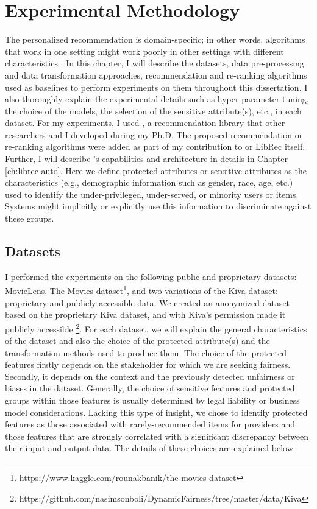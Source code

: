 \chapter{Experimental Methodology}
\label{ch:methodology}

The personalized recommendation is domain-specific; in other words, algorithms that work in one setting might work poorly in other settings with different characteristics \cite{Beel2016Reproducibility,bellogin2021improving}. In this chapter, I will describe the datasets, data pre-processing and data transformation approaches, recommendation and re-ranking algorithms used as baselines to perform experiments on them throughout this dissertation. I also thoroughly explain the experimental details such as hyper-parameter tuning, the choice of the models, the selection of the sensitive attribute(s), etc., in each dataset. For my experiments, I used \libauto{}, a recommendation library that other researchers and I developed during my Ph.D. The proposed recommendation or re-ranking algorithms were added as part of my contribution to \libauto{} or LibRec itself. Further, I will describe \libauto{}'s capabilities and architecture in details in Chapter \ref{ch:librec-auto}. Here we define protected attributes or sensitive attributes as the characteristics (e.g., demographic information such as gender, race, age, etc.) used to identify the under-privileged, under-served, or minority users or items. Systems might implicitly or explicitly use this information to discriminate against these groups.
    
\section{Datasets}

I performed the experiments on the following public and proprietary datasets: MovieLens\cite{movielens}, The Movies dataset\footnote{https://www.kaggle.com/rounakbanik/the-movies-dataset}, and two variations of the Kiva dataset: proprietary and publicly accessible data. We created an anonymized dataset based on the proprietary Kiva dataset, and with Kiva's permission made it publicly accessible \footnote{https://github.com/nasimsonboli/DynamicFairness/tree/master/data/Kiva}. For each dataset, we will explain the general characteristics of the dataset and also the choice of the protected attribute(s) and the transformation methods used to produce them. The choice of the protected features firstly depends on the stakeholder for which we are seeking fairness. Secondly, it depends on the context and the previously detected unfairness or biases in the dataset. Generally, the choice of sensitive features and protected groups within those features is usually determined by legal liability or business model considerations. Lacking this type of insight, we chose to identify protected features as those associated with rarely-recommended items for providers and those features that are strongly correlated with a significant discrepancy between their input and output data. The details of these choices are explained below.

